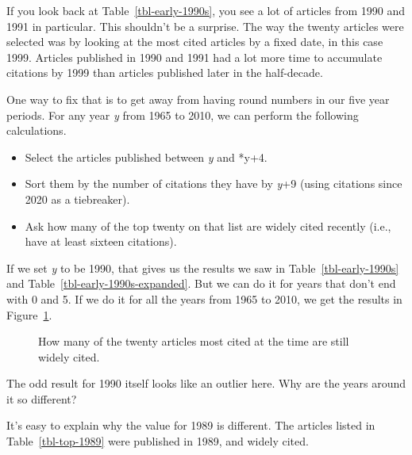 \documentclass[
  10pt,
  letterpaper,
  DIV=11,
  numbers=noendperiod,
  twoside]{scrartcl}
\providecommand{\tightlist}{%
  \setlength{\itemsep}{0pt}\setlength{\parskip}{0pt}}\usepackage{longtable,booktabs,array}
\begin{document}
If you look back at Table~\ref{tbl-early-1990s}, you see a lot of
articles from 1990 and 1991 in particular. This shouldn't be a surprise.
The way the twenty articles were selected was by looking at the most
cited articles by a fixed date, in this case 1999. Articles published in
1990 and 1991 had a lot more time to accumulate citations by 1999 than
articles published later in the half-decade.

One way to fix that is to get away from having round numbers in our five
year periods. For any year \emph{y} from 1965 to 2010, we can perform
the following calculations.

\begin{itemize}
\tightlist
\item
  Select the articles published between \emph{y} and *y+4.
\item
  Sort them by the number of citations they have by \emph{y}+9 (using
  citations since 2020 as a tiebreaker).
\item
  Ask how many of the top twenty on that list are widely cited recently
  (i.e., have at least sixteen citations).
\end{itemize}

If we set \emph{y} to be 1990, that gives us the results we saw in
Table~\ref{tbl-early-1990s} and Table~\ref{tbl-early-1990s-expanded}.
But we can do it for years that don't end with 0 and 5. If we do it for
all the years from 1965 to 2010, we get the results in
Figure~\ref{fig-all-still-standing}.

\begin{figure}


\caption{\label{fig-all-still-standing}How many of the twenty articles
most cited at the time are still widely cited.}

\end{figure}%

The odd result for 1990 itself looks like an outlier here. Why are the
years around it so different?

It's easy to explain why the value for 1989 is different. The articles
listed in Table~\ref{tbl-top-1989} were published in 1989, and widely
cited.
\end{document}
